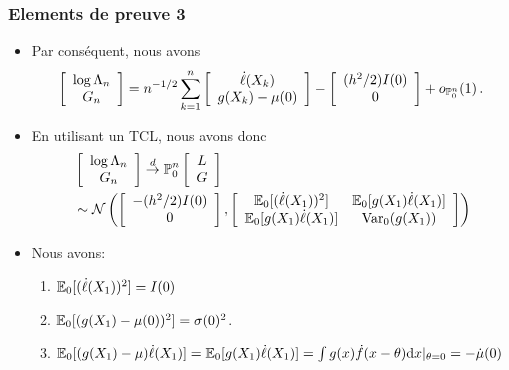 \begin{frame}
\frametitle{Elements de preuve 3}
\begin{itemize}
\item Par conséquent, nous avons
\[
\left[\begin{array}{c}
  \log \Lambda_n \\
  G_n
\end{array}
\right]
=
n^{-1/2}  \sum_{k=1}^n \left[ \begin{array}{c} \dot \ell(X_k) \\ g(X_k) - \mu(0) \end{array} \right]
-
\left[
\begin{array}{c}
(h^2/2) I(0) \\
0
\end{array}
\right]
+
o_{\operatorname{{\mathbb P}}_{0}^n}(1) \,.
\]
\item En utilisant un TCL, nous avons donc
\begin{align*}
&\left[\begin{array}{c}
  \log \Lambda_n \\
  G_n
\end{array}
\right]
\stackrel{d}{\rightarrow}{\operatorname{{\mathbb P}}_{0}^n}
\left[\begin{array}{c}
  L \\
  G
\end{array}
\right]
\\
&\sim
\mathcal{N}\left( \left[ \begin{array}{c} - (h^2/2) I(0) \\ 0 \end{array}\right], \left[
\begin{array}{cc}
\operatorname{{\mathbb E}}_0[ (\dot \ell(X_1))^2] & \operatorname{{\mathbb E}}_0[ g(X_1)  \dot \ell(X_1)] \\
\operatorname{{\mathbb E}}_0[ g(X_1)  \dot \ell(X_1)] & \operatorname{\mathrm{Var}}_0(g(X_1))
\end{array}
\right] \right)
\end{align*}
\item  Nous avons:
\begin{enumerate}
\item $\operatorname{{\mathbb E}}_0[ (\dot \ell(X_1))^2]= I(0)$
\item $\operatorname{{\mathbb E}}_0[ (g(X_1)- \mu(0))^2]= \sigma(0)^2$.
\item $\operatorname{{\mathbb E}}_0[ (g(X_1) - \mu) \dot \ell(X_1)]= \operatorname{{\mathbb E}}_0[ g(X_1) \dot\ell(X_1)]= \int g(x) \dot f(x-\theta) \mathrm{d} x \vert_{\theta=0}= -\dot\mu(0)$
\end{enumerate}
\end{itemize}
\end{frame}


